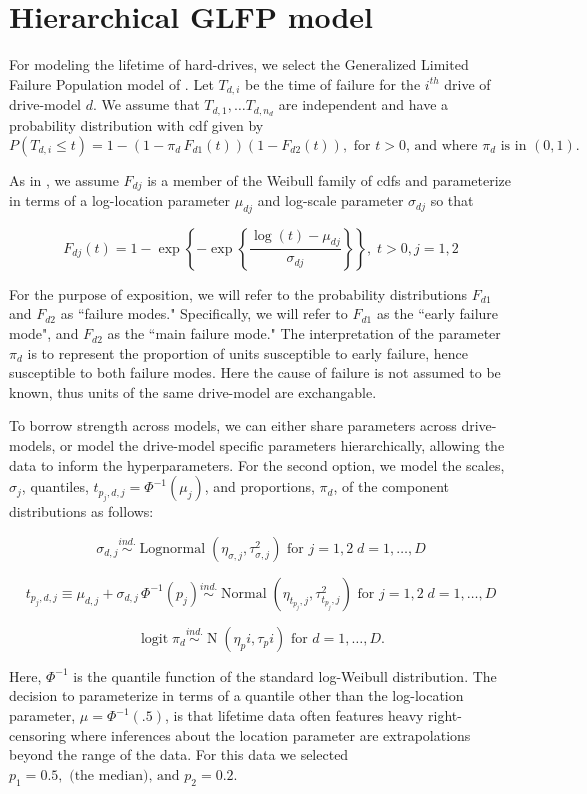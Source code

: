 \documentclass{article}
\newcommand{\ind}{\stackrel{ind.}{\sim}}
\newcommand{\op}{\operatorname}
\begin{document}
\section{Hierarchical GLFP model}
For modeling the lifetime of hard-drives, we select the Generalized Limited Failure Population model of \citet{chan}.
Let $T_{d,i}$ be the time of failure for the $i^{th}$ drive of drive-model $d$.
We assume that $T_{d,1},\ldots T_{d,n_d}$ are independent and have a probability distribution with cdf given by
$$P(T_{d,i}\le t) = 1 - (1-\pi_d\, F_{d1}(t))(1 - F_{d2}(t)), \mbox{ for }t>0 \mbox{, and where } \pi_d \mbox{ is in }(0,1).$$

As in \cite{chan}, we assume $F_{dj}$ is a member of the Weibull family of cdfs and parameterize in terms of a log-location parameter $\mu_{dj}$ and log-scale parameter $\sigma_{dj}$ so that

$$F_{dj}(t) = 1 - \exp \left\{ -\exp \left\{ \frac{ \log (t) - \mu_{dj}}{\sigma_{dj}} \right\} \right\},\; t>0, j=1,2$$

For the purpose of exposition, we will refer to the probability distributions $F_{d1}$ and $F_{d2}$ as ``failure modes." Specifically, we will refer to $F_{d1}$ as the ``early failure mode", and $F_{d2}$ as the ``main failure mode." The interpretation of the parameter $\pi_d$ is to represent the proportion of units susceptible to early failure, hence susceptible to both failure modes. Here the cause of failure is not assumed to be known, thus units of the same drive-model are exchangable.

To borrow strength across models, we can either share parameters across drive-models, or model the drive-model specific parameters hierarchically, allowing the data to inform the hyperparameters. For the second option, we model the scales, $\sigma_j$, quantiles, $t_{p_j,d,j} = \Phi^{-1}(\mu_j)$, and proportions, $\pi_d$, of the component distributions as follows:

$$\sigma_{d,j} \ind \op{Lognormal} \left( \eta_{\sigma,j}, \tau^2_{\sigma,j} \right) \mbox{ for } j=1,2\; d=1,\ldots,D$$

$$t_{p_j,d,j} \equiv \mu_{d,j} + \sigma_{d,j}\,\Phi^{-1}(p_j)  \ind \op{Normal} \left(\eta_{t_{p_j},j}, \tau^2_{t_{p_j},j}\right) \mbox{ for } j=1,2\; d=1,\ldots,D$$

$$\op{logit} \pi_d \ind \op{N}(\eta_pi, \tau_pi) \mbox{ for } d=1,\ldots,D.$$

Here, $\Phi^{-1}$ is the quantile function of the standard log-Weibull distribution. The decision to parameterize in terms of a quantile other than the log-location parameter, $\mu = \Phi^{-1}(.5)$, is that lifetime data often features heavy right-censoring where inferences about the location parameter are extrapolations beyond the range of the data. For this data we selected $p_1=0.5,\mbox{ (the median), and } p_2 = 0.2$.
\end{document}
